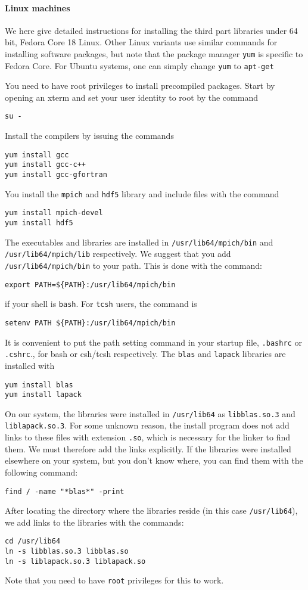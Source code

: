 \documentclass[11pt]{article}
\begin{document}
\paragraph{Linux machines}
We here give detailed instructions for installing the third part libraries under 64 bit, Fedora Core 18 Linux. Other Linux variants use similar commands for installing software packages, but note that the package manager \verb+yum+ is specific to Fedora Core. For Ubuntu systems, one can simply change \verb+yum+ to \verb+apt-get+

You need to have root privileges to install precompiled packages. Start by opening an xterm and set your user identity to root by the command
\begin{verbatim}
su -
\end{verbatim}
Install the compilers by issuing the commands
\begin{verbatim}
yum install gcc
yum install gcc-c++
yum install gcc-gfortran
\end{verbatim}
You install the \verb+mpich+ and \verb+hdf5+ library and include files with the command
\begin{verbatim}
yum install mpich-devel
yum install hdf5
\end{verbatim}

The executables and libraries are installed in \verb+/usr/lib64/mpich/bin+ and  \verb+/usr/lib64/mpich/lib+ respectively. We suggest that you add \verb+/usr/lib64/mpich/bin+ to your path. This is done with the command:
\begin{verbatim}
export PATH=${PATH}:/usr/lib64/mpich/bin
\end{verbatim}
if your shell is \verb+bash+. For \verb+tcsh+ users, the command is
\begin{verbatim}
setenv PATH ${PATH}:/usr/lib64/mpich/bin
\end{verbatim}
It is convenient to put the path setting command in your startup file, \verb+.bashrc+ or \verb+.cshrc+., for bash or csh/tcsh respectively.
The \verb+blas+ and \verb+lapack+ libraries are installed with
\begin{verbatim}
yum install blas
yum install lapack
\end{verbatim}
On our system, the libraries were installed in \verb+/usr/lib64+ as \verb+libblas.so.3+ and \verb+liblapack.so.3+. For some unknown reason, the install program does not add links to these files with extension \verb+.so+, which is necessary for the linker to find them. We must therefore add the links explicitly. If the libraries were installed elsewhere on your system, but you don't know where, you can find them with the following command:
\begin{verbatim}
find / -name "*blas*" -print
\end{verbatim}
After locating the directory where the libraries reside (in this case \verb+/usr/lib64+), we add
links to the libraries with the commands:
\begin{verbatim}
cd /usr/lib64
ln -s libblas.so.3 libblas.so
ln -s liblapack.so.3 liblapack.so
\end{verbatim}
Note that you need to have \verb+root+ privileges for this to work.
\end{document}
